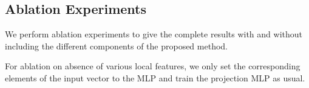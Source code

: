 \begin{table}[h]
\caption{\small{Ablation studies on impact of various components of the proposed method.}}
\vspace{-2ex}
    \label{tabAblAll}
\centering
   
    \vspace{-2ex}
     
\end{table}

 \vspace{-1.5ex}
\subsection{Ablation Experiments}\label{subsec:ablation}
 \vspace{-0.5ex}

We perform ablation experiments to give the complete results with and without including the different
components of the proposed method.

For ablation on absence of various local features, we only set the corresponding elements of the
input vector to the MLP and train the projection MLP as usual. 

